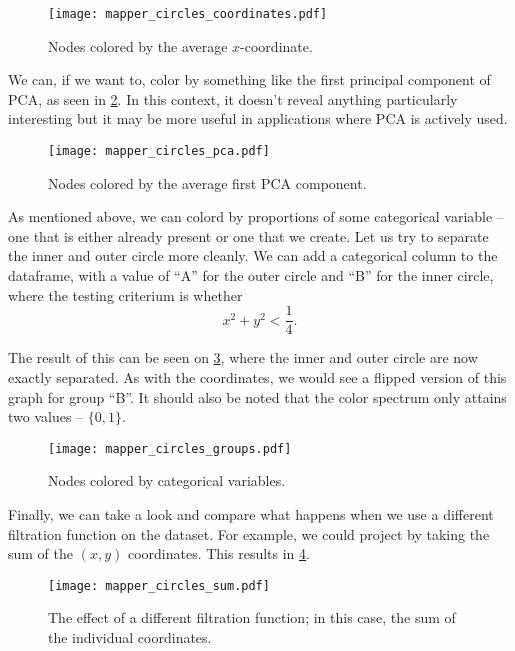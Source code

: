 \begin{figure}[h!]
  \centering
  \texttt{[image: mapper\_circles\_coordinates.pdf]}
  \caption{Nodes colored by the average $x$-coordinate.}
  \label{fig:mapper_circles_coordinates}
\end{figure}

We can, if we want to, color by something like the first principal component of PCA, as seen in \ref{fig:mapper_circles_pca}. In this context, it doesn't reveal anything particularly interesting but it may be more useful in applications where PCA is actively used.

\begin{figure}[h!]
  \centering
  \texttt{[image: mapper\_circles\_pca.pdf]}
  \caption{Nodes colored by the average first PCA component.}
  \label{fig:mapper_circles_pca}
\end{figure}

As mentioned above, we can colord by proportions of some categorical variable -- one that is either already present or one that we create. Let us try to separate the inner and outer circle more cleanly. We can add a categorical column to the dataframe, with a value of ``A'' for the outer circle and ``B'' for the inner circle, where the testing criterium is whether
\begin{equation*}
  x^{2} + y^{2} < \frac{1}{4}.
\end{equation*}

The result of this can be seen on \ref{fig:mapper_circles_groups}, where the inner and outer circle are now exactly separated. As with the coordinates, we would see a flipped version of this graph for group ``B''. It should also be noted that the color spectrum only attains two values -- $\{0, 1\}$.

\begin{figure}[h!]
  \centering
  \texttt{[image: mapper\_circles\_groups.pdf]}
  \caption{Nodes colored by categorical variables.}
  \label{fig:mapper_circles_groups}
\end{figure}

Finally, we can take a look and compare what happens when we use a different filtration function on the dataset. For example, we could project by taking the sum of the $(x,y)$ coordinates. This results in \ref{fig:mapper_circles_sum}.

\begin{figure}[h!]
  \centering
  \texttt{[image: mapper\_circles\_sum.pdf]}
  \caption{The effect of a different filtration function; in this case, the sum of the individual coordinates.}
  \label{fig:mapper_circles_sum}
\end{figure}

